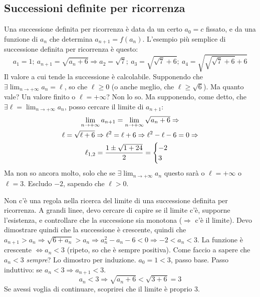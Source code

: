 \documentclass[12pt,a4paper]{article}
\begin{document}
\subsection{Successioni definite per ricorrenza}
Una successione definita per ricorrenza \`e data da un certo $a_0 = c$ fissato,
e da una funzione di $a_n$ che determina $a_{n+1} = f(a_n)$.
L'esempio pi\`u semplice di successione definita per ricorrenza \`e questo:
$$
a_1 = 1 ; \ a_{n+1} = \sqrt{a_n + 6} \Rightarrow a_2 = \sqrt{7} ; \
a_3 = \sqrt{\sqrt{7} + 6} ; \ a_4 = \sqrt{\sqrt{\sqrt{7} + 6} + 6}
$$
Il valore a cui tende la successione \`e calcolabile. Supponendo che $\exists 
\lim_{n \to +\infty} a_n = \ell$, so che $\ell \geq 0$ (o anche meglio, che 
$\ell \geq \sqrt{6}$). Ma quanto vale? Un valore finito o $\ell = +\infty$?
Non lo so. Ma supponendo, come detto, che $\exists \ell = \lim_{n \to +\infty}
a_n$, posso cercare il limite di $a_{n+1}$:
\begin{multline*}
\lim_{n \to +\infty} a_{n+1} = \lim_{n \to +\infty} \sqrt{a_n + 6} \Rightarrow 
\\ \ell = \sqrt{\ell + 6} \Rightarrow \ell^2 = \ell + 6 \Rightarrow
\ell^2 - \ell - 6 = 0 
\Rightarrow \\ \ell_{1,2} = {1 \pm \sqrt{1 + 24} \over 2} =
\begin{cases} -2 \\ 3 \end{cases}
\end{multline*}
Ma non so ancora molto, solo che se $\exists \lim_{n \to +\infty} a_n$ questo
sar\`a o $\ell = +\infty$ o $\ell = 3$. Escludo $-2$, sapendo che $\ell > 0$.

Non c'\`e una regola nella ricerca del limite di una successione definita
per ricorrenza. A grandi linee, devo cercare di capire se il limite c'\`e,
supporne l'esistenza, e controllare che la successione sia monotona 
($\Rightarrow$ c'\`e il limite). Devo dimostrare quindi che la successione \`e
crescente, quindi che $a_{n+1} > a_n \Rightarrow \sqrt{6 + a_n} > a_n 
\Rightarrow a_n^2 - a_n - 6 < 0 \Rightarrow -2 < a_n < 3$. La funzione \`e 
crescente $\Leftrightarrow a_n < 3$ (ripeto, so che \`e sempre positiva).
Come faccio a sapere che $a_n < 3$ \textit{sempre}? Lo dimostro per induzione.
$a_0 = 1 < 3$, passo base. Passo induttivo: se $a_n < 3 \Rightarrow 
a_{n+1} < 3$.
$$
a_n < 3 \Rightarrow \sqrt{a_n + 6} < \sqrt{3 + 6} = 3
$$
Se avessi voglia di continuare, scoprirei che il limite \`e proprio $3$.
\end{document}
